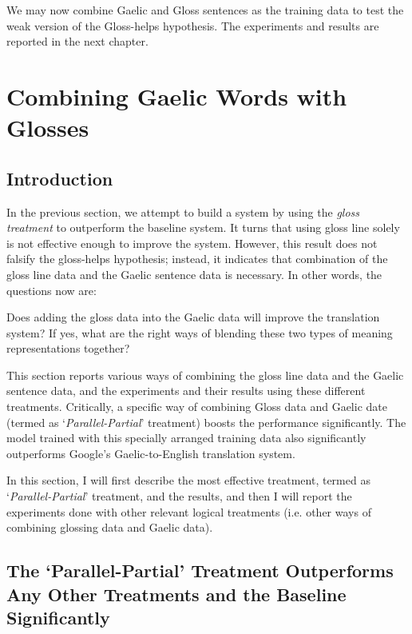 \documentclass[final]{ua-thesis}
\numberwithin{equation}{section}
\begin{document}
We may now combine Gaelic and Gloss sentences as the training data to test the weak version of the Gloss-helps hypothesis. The experiments and results are reported in the next chapter.
\chapter{Combining Gaelic Words with Glosses}\label{gd_plus_gl_to_en}
\section{Introduction}
In the previous section, we attempt to build a system by using the \textit{gloss treatment} to outperform the baseline system. It turns that using gloss line solely is not effective enough to improve the system. However, this result does not falsify the gloss-helps hypothesis; instead, it indicates that combination of the gloss line data and the Gaelic sentence data is necessary. In other words, the questions now are: 
\begin{exe}
	\ex 
	\begin{xlist}
		\ex Does adding the gloss data into the Gaelic data will improve the translation system? 
		\ex If yes, what are the right ways of blending these two types of meaning representations together? 
	\end{xlist}	
\end{exe}

This section reports various ways of combining the gloss line data and the Gaelic sentence data, and the experiments and their results using these different treatments. Critically, a specific way of combining Gloss data and Gaelic date (termed as `\textit{Parallel-Partial}' treatment) boosts the performance significantly. The model trained with this specially arranged training data also significantly outperforms Google's Gaelic-to-English translation system.

In this section, I will first describe the most effective treatment, termed as `\textit{Parallel-Partial}' treatment, and the results, and then I will report the experiments done with other relevant logical treatments (i.e. other ways of combining glossing data and Gaelic data). 

\section{The `Parallel-Partial' Treatment Outperforms Any Other Treatments and the Baseline Significantly}
\end{document}
